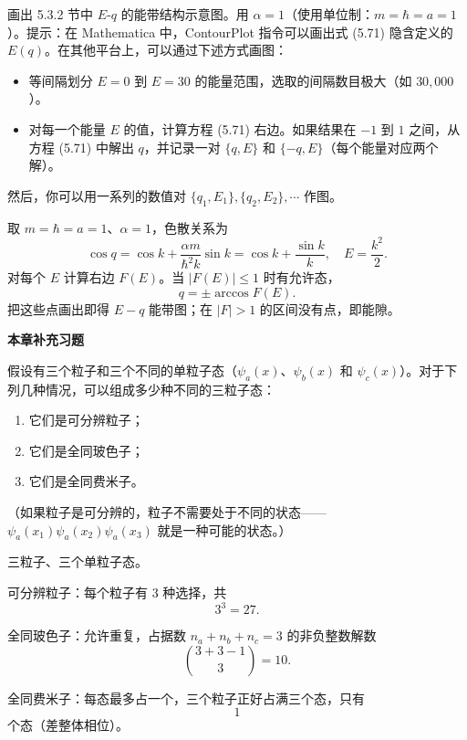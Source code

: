 \begin{question}
画出 5.3.2 节中 $E$-$q$ 的能带结构示意图。用 $\alpha=1$（使用单位制：$m=\hbar=a=1$）。提示：在 Mathematica 中，ContourPlot 指令可以画出式 (5.71) 隐含定义的 $E(q)$。在其他平台上，可以通过下述方式画图：
\begin{itemize}
\item 等间隔划分 $E=0$ 到 $E=30$ 的能量范围，选取的间隔数目极大（如 $30{,}000$）。
\item 对每一个能量 $E$ 的值，计算方程 (5.71) 右边。如果结果在 $-1$ 到 $1$ 之间，从方程 (5.71) 中解出 $q$，并记录一对 $\{q,E\}$ 和 $\{-q,E\}$（每个能量对应两个解）。
\end{itemize}
然后，你可以用一系列的数值对 $\{q_1,E_1\},\{q_2,E_2\},\cdots$ 作图。

\par\smallskip
{}

\end{question}
\begin{solution}

取 $m=\hbar=a=1$、$\alpha=1$，色散关系为
\[
\cos q=\cos k+\frac{\alpha m}{\hbar^2 k}\sin k
=\cos k+\frac{\sin k}{k},
\quad E=\frac{k^2}{2}.
\]
对每个 $E$ 计算右边 $F(E)$。当 $|F(E)|\le1$ 时有允许态，
\[
q=\pm\arccos F(E).
\]
把这些点画出即得 $E-q$ 能带图；在 $|F|>1$ 的区间没有点，即能隙。

\end{solution}

\begin{center}\Large\bfseries 本章补充习题\end{center}

\begin{question}
假设有三个粒子和三个不同的单粒子态（$\psi_a(x)$、$\psi_b(x)$ 和 $\psi_c(x)$）。对于下列几种情况，可以组成多少种不同的三粒子态：
\begin{enumerate}
\item 它们是可分辨粒子；
\item 它们是全同玻色子；
\item 它们是全同费米子。
\end{enumerate}
（如果粒子是可分辨的，粒子不需要处于不同的状态——$\psi_a(x_1)\psi_a(x_2)\psi_a(x_3)$ 就是一种可能的状态。）
\end{question}
\begin{solution}

三粒子、三个单粒子态。

可分辨粒子：每个粒子有 3 种选择，共
\[
3^3=27.
\]

全同玻色子：允许重复，占据数 $n_a+n_b+n_c=3$ 的非负整数解数
\[
\binom{3+3-1}{3}=10.
\]

全同费米子：每态最多占一个，三个粒子正好占满三个态，只有
\[
1
\]
个态（差整体相位）。

\end{solution}

